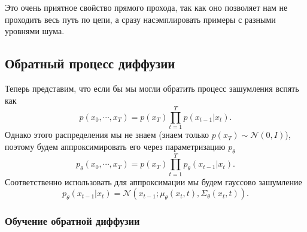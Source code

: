 \documentclass[11pt, a4paper, twocolumn, twoside]{article} %
\begin{document}
Это очень приятное свойство прямого прохода, так как оно позволяет нам не проходить весь путь по цепи, а сразу насэмплировать примеры с разными уровнями шума.

\subsection{Обратный процесс диффузии}

Теперь представим, что если бы мы могли обратить процесс зашумления вспять как
\begin{equation}
	p(x_0,\cdots, x_T) = p(x_T)\prod\limits_{t=1}^Tp(x_{t-1}|x_t).
\end{equation}
Однако этого распределения мы не знаем (знаем только $p(x_T)\sim\mathcal{N}(0,I)$), поэтому будем аппроксимировать его через параметризацию $p_\theta$
\begin{equation}
	p_\theta(x_0,\cdots, x_T) = p(x_T)\prod\limits_{t=1}^Tp_\theta(x_{t-1}|x_t).
\end{equation}
Соответственно использовать для аппроксимации мы будем гауссово зашумление
\begin{equation}
	p_\theta(x_{t-1}|x_t) = \mathcal{N}(x_{t-1}; \mu_\theta(x_t, t), \Sigma_\theta(x_t, t)).
\end{equation}

\subsubsection{Обучение обратной диффузии}
\end{document}
